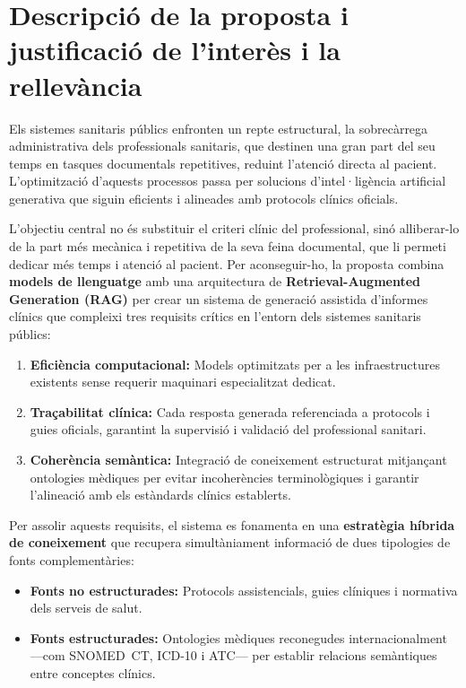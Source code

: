 \documentclass[CAT]{TFUOC}%
\begin{document}
\section{Descripció de la proposta i justificació de l'interès i la rellevància}

Els sistemes sanitaris públics enfronten un repte estructural, la sobrecàrrega administrativa dels professionals sanitaris, que destinen una gran part del seu temps en tasques documentals repetitives, reduint l'atenció directa al pacient. L'optimització d'aquests processos passa per solucions d'intel·ligència artificial generativa que siguin eficients i alineades amb protocols clínics oficials.

L'objectiu central no és substituir el criteri clínic del professional, sinó alliberar-lo de la part més mecànica i repetitiva de la seva feina documental, que li permeti dedicar més temps i atenció al pacient. Per aconseguir-ho, la proposta combina \textbf{models de llenguatge} amb una arquitectura de \textbf{Retrieval-Augmented Generation (RAG)} per crear un sistema de generació assistida d'informes clínics que compleixi tres requisits crítics en l'entorn dels sistemes sanitaris públics:

\begin{enumerate}
    \item \textbf{Eficiència computacional:} Models optimitzats per a les infraestructures existents sense requerir maquinari especialitzat dedicat.
    
    \item \textbf{Traçabilitat clínica:} Cada resposta generada referenciada a protocols i guies oficials, garantint la supervisió i validació del professional sanitari.
    
    \item \textbf{Coherència semàntica:} Integració de coneixement estructurat mitjançant ontologies mèdiques per evitar incoherències terminològiques i garantir l'alineació amb els estàndards clínics establerts.
\end{enumerate}

Per assolir aquests requisits, el sistema es fonamenta en una \textbf{estratègia híbrida de coneixement} que recupera simultàniament informació de dues tipologies de fonts complementàries:

\begin{itemize}
    \item \textbf{Fonts no estructurades:} Protocols assistencials, guies clíniques i normativa dels serveis de salut.
    \item \textbf{Fonts estructurades:} Ontologies mèdiques reconegudes internacionalment ---com SNOMED~CT, ICD-10 i ATC--- per establir relacions semàntiques entre conceptes clínics.
\end{itemize}
\end{document}
